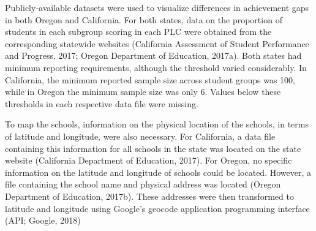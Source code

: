 \documentclass[man, fleqn, noextraspace]{apa6}
\theoremstyle{definition}
\theoremstyle{definition}
\theoremstyle{definition}
\theoremstyle{remark}
\begin{document}
Publicly-available datasets were used to visualize differences in
achievement gaps in both Oregon and California. For both states, data on
the proportion of students in each subgroup scoring in each PLC were
obtained from the corresponding statewide websites (California
Assessment of Student Performance and Progress, 2017; Oregon Department
of Education, 2017a). Both states had minimum reporting requirements,
although the threshold varied considerably. In California, the minimum
reported sample size across student groups was 100, while in Oregon the
minimum sample size was only 6. Values below these thresholds in each
respective data file were missing.

To map the schools, information on the physical location of the schools,
in terms of latitude and longitude, were also necessary. For California,
a data file containing this information for all schools in the state was
located on the state website (California Department of Education, 2017).
For Oregon, no specific information on the latitude and longitude of
schools could be located. However, a file containing the school name and
physical address was located (Oregon Department of Education, 2017b).
These addresses were then transformed to latitude and longitude using
Google's geocode application programming interface (API; Google, 2018)
\end{document}
